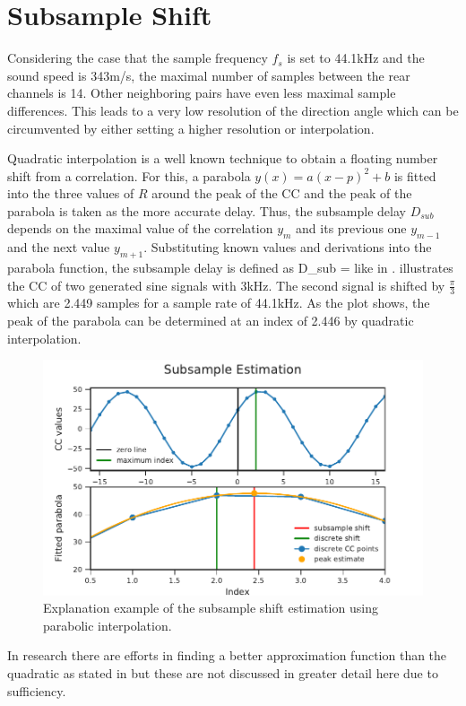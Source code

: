 \section{Subsample Shift}
\label{sec:02_subsampleShift}

Considering the case that the sample frequency $f_s$ is set to 44.1\si{\kilo\hertz}
and the sound speed is 343\si{m/s}, the maximal number of samples
between the rear channels is 14.
Other neighboring pairs have even less maximal sample differences.
This leads to a very low resolution of the direction angle which can be
circumvented by either setting a higher resolution or interpolation.

Quadratic interpolation is a well known technique to obtain a floating number
shift from a correlation.
For this, a parabola $y(x) = a(x-p)^2+b$ is fitted into the three values of $R$ around the peak
of the \ac{CC} and the peak of the parabola is taken as the more accurate
delay.
Thus, the subsample delay $D_{sub}$ depends on the maximal value of the correlation $y_m$
and its previous one $y_{m-1}$ and the next value $y_{m+1}$.
Substituting known values and derivations into the parabola function,
the subsample delay is defined as
\bal
	D_{sub} = 
	\label{eq:02_subsample}
\eal
like in \cite{C_H_subsampleDelay}.
 illustrates the \ac{CC} of two generated sine signals with 3\si{\kilo\hertz}.
The second signal is shifted by $\frac{\pi}{3}$ which are 2.449 samples for a sample rate
of 44.1kHz.
As the plot shows, the peak of the parabola can be determined at an index of 2.446 by
quadratic interpolation.
\begin{figure}[ht]
	\centering
		\includegraphics[]{figures/subsample_shift}
	\caption{Explanation example of the subsample shift estimation using parabolic interpolation.}
    \label{fig:02_subsampleShift}
\end{figure}
In research there are efforts in finding a better approximation function than the quadratic as stated
in \cite{S_L_subsampleInterpolation} but these are not discussed in greater detail here
due to sufficiency.
